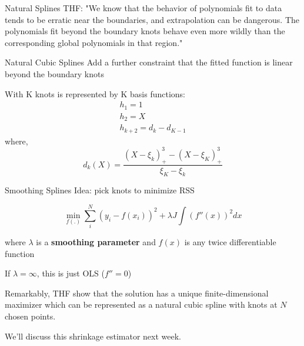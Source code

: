 \begin{frame}{Natural Splines}
  THF: "We know that the behavior of polynomials fit to data tends to be erratic
  near the boundaries, and extrapolation can be dangerous. The polynomials fit beyond the boundary knots behave even more wildly than the corresponding global polynomials
  in that region." 

  \alert{Natural Cubic Splines} Add a further constraint that the fitted function is linear beyond the boundary knots

  With K knots is represented by K basis functions:
\vspace{-8pt}
  \begin{eqnarray*}
    h_1 = 1 \\
    h_2 = X \\
    h_{k+2} = d_k - d_{K-1}
  \end{eqnarray*} 
  where, $$d_k(X) = \frac{(X-\xi_k)_+^3 - (X-\xi_K)_+^3 }{\xi_K - \xi_k} $$

\end{frame}

\begin{frame}{Smoothing Splines}
Idea: pick knots to minimize RSS 

\[
\min_{f(.)} \sum_i^N (y_i-f(x_i))^2 +\lambda J \int (f''(x))^2 dx 
\]

where $\lambda$ is a \textbf{smoothing parameter} and $f(x)$ is any twice differentiable function

If $\lambda = \infty$, this is just OLS ($f''=0$)

\pause

Remarkably, THF show that the solution has a unique finite-dimensional maximizer which can be represented as a natural cubic spline with knots at $N$ chosen points. 

We'll discuss this \alert{shrinkage} estimator next week.
\end{frame}

